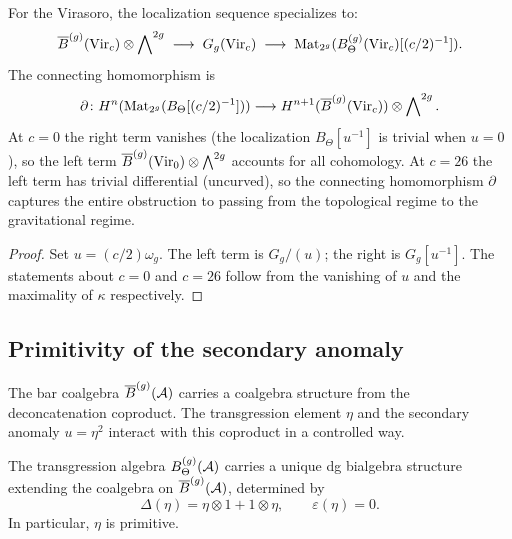 \begin{corollary}
\label{cor:g9-localization-vir}
For the Virasoro, the localization sequence specializes to:
\begin{equation}\label{eq:g9-localization-vir}
\overline{B}^{(g)}(\mathrm{Vir}_c) \otimes \bigwedge\nolimits^{2g}
\;\longrightarrow\;
G_g(\mathrm{Vir}_c)
\;\longrightarrow\;
\mathrm{Mat}_{2^g}(B_\Theta^{(g)}(\mathrm{Vir}_c)[(c/2)^{-1}]).
\end{equation}
The connecting homomorphism is
\begin{equation}\label{eq:g9-connecting-vir}
\partial\colon
H^n(\mathrm{Mat}_{2^g}(B_\Theta[(c/2)^{-1}]))
\longrightarrow
H^{n+1}(\overline{B}^{(g)}(\mathrm{Vir}_c))
\otimes \bigwedge\nolimits^{2g}.
\end{equation}
At $c = 0$ the right term vanishes (the localization
$B_\Theta[u^{-1}]$ is trivial when $u = 0$), so the left term
$\overline{B}^{(g)}(\mathrm{Vir}_0) \otimes \bigwedge^{2g}$ accounts for all
cohomology. At $c = 26$ the left term has trivial
differential (uncurved), so the connecting homomorphism
$\partial$ captures the entire obstruction to passing from the
topological regime to the gravitational regime.
\end{corollary}

\begin{proof}
Set $u = (c/2)\omega_g$. The left term is $G_g/(u)$; the right is
$G_g[u^{-1}]$. The statements about $c = 0$ and $c = 26$ follow from
the vanishing of $u$ and the maximality of $\kappa$ respectively.
\end{proof}

%
%

\subsection{Primitivity of the secondary anomaly}
\label{subsec:primitivity}

The bar coalgebra $\overline{B}^{(g)}(\mathcal{A})$ carries a coalgebra structure
from the deconcatenation coproduct. The transgression element $\eta$
and the secondary anomaly $u = \eta^2$ interact with this coproduct in
a controlled way.

\begin{proposition}
\label{prop:g9-bialgebra}
The transgression algebra $B_\Theta^{(g)}(\mathcal{A})$ carries a unique
dg bialgebra structure extending the coalgebra on
$\overline{B}^{(g)}(\mathcal{A})$, determined by
\begin{equation}\label{eq:g9-eta-coproduct}
\Delta(\eta) = \eta \otimes 1 + 1 \otimes \eta,
\qquad
\varepsilon(\eta) = 0.
\end{equation}
In particular, $\eta$ is primitive.
\end{proposition}

